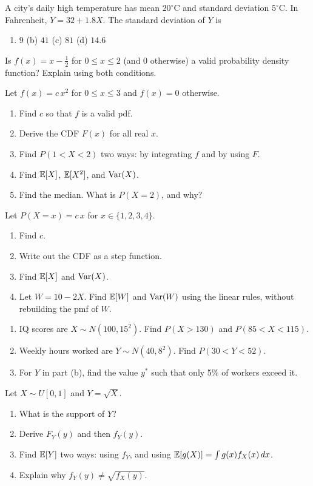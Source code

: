 \documentclass[11pt]{article}
\begin{document}
A city's daily high temperature has mean $20^\circ$C and standard deviation $5^\circ$C. In Fahrenheit, $Y=32+1.8X$. The standard deviation of $Y$ is
\begin{enumerate}[label=(\alph*)]
  \item $9$ \quad (b) $41$ \quad (c) $81$ \quad (d) $14.6$
\end{enumerate}

Is $f(x)=x-\tfrac12$ for $0\le x\le 2$ (and $0$ otherwise) a valid probability density function? Explain using both conditions.

Let $f(x)=c\,x^2$ for $0\le x\le 3$ and $f(x)=0$ otherwise.
\begin{enumerate}[label=(\alph*)]
  \item Find $c$ so that $f$ is a valid pdf.
  \item Derive the CDF $F(x)$ for all real $x$.
  \item Find $P(1<X<2)$ two ways: by integrating $f$ and by using $F$.
  \item Find $\mathbb{E}[X]$, $\mathbb{E}[X^2]$, and $\operatorname{Var}(X)$.
  \item Find the median. What is $P(X=2)$, and why?
\end{enumerate}

Let $P(X=x)=c\,x$ for $x\in\{1,2,3,4\}$.
\begin{enumerate}[label=(\alph*)]
  \item Find $c$.
  \item Write out the CDF as a step function.
  \item Find $\mathbb{E}[X]$ and $\operatorname{Var}(X)$.
  \item Let $W=10-2X$. Find $\mathbb{E}[W]$ and $\operatorname{Var}(W)$ using the linear rules, without rebuilding the pmf of $W$.
\end{enumerate}

\begin{enumerate}[label=(\alph*)]
  \item IQ scores are $X\sim N(100,15^2)$. Find $P(X>130)$ and $P(85<X<115)$.
  \item Weekly hours worked are $Y\sim N(40,8^2)$. Find $P(30<Y<52)$.
  \item For $Y$ in part (b), find the value $y^*$ such that only 5\% of workers exceed it.
\end{enumerate}

Let $X\sim U[0,1]$ and $Y=\sqrt{X}$.
\begin{enumerate}[label=(\alph*)]
  \item What is the support of $Y$?
  \item Derive $F_Y(y)$ and then $f_Y(y)$.
  \item Find $\mathbb{E}[Y]$ two ways: using $f_Y$, and using $\mathbb{E}[g(X)]=\int g(x)f_X(x)\,dx$.
  \item Explain why $f_Y(y)\neq \sqrt{f_X(y)}$.
\end{enumerate}
\end{document}
